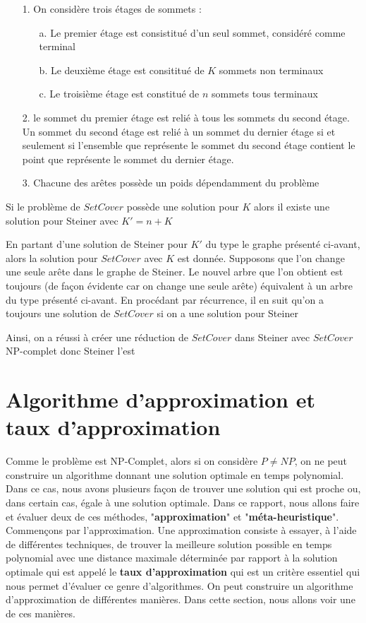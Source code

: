 \documentclass[11pt,french]{report}
\begin{document}
        \begin{itemize}
	\item[1.] On considère trois étages de sommets :
          \begin{itemize}
          \item[a.] Le premier étage est consistitué d'un seul sommet, considéré comme terminal
          \item[b.] Le deuxième étage est consititué de $K$ sommets non terminaux
          \item[c.] Le troisième étage est constitué de $n$ sommets tous terminaux
          \end{itemize}
        \item[2.] le sommet du premier étage est relié à tous les sommets du second étage. Un sommet du second étage est relié à un sommet du dernier étage si et seulement si l'ensemble que représente le sommet du second étage contient le point que représente le sommet du dernier étage.
          \item[3.] Chacune des arêtes possède un poids dépendamment du problème
	\end{itemize}

        Si le problème de $Set Cover$ possède une solution pour $K$ alors il existe une solution pour Steiner avec $K' = n+K$

        En partant d'une solution de Steiner pour $K'$ du type le graphe présenté ci-avant, alors la solution pour $Set Cover$ avec $K$ est donnée.
        Supposons que l'on change une seule arête dans le graphe de Steiner. Le nouvel arbre que l'on obtient est toujours (de façon évidente car on change une seule arête) équivalent à un arbre du type présenté ci-avant. En procédant par récurrence, il en suit qu'on a toujours une solution de $Set Cover$ si on a une solution pour Steiner


        Ainsi, on a réussi à créer une réduction de $Set Cover$ dans Steiner avec $Set Cover$ NP-complet donc Steiner l'est
        
	\section{Algorithme d'approximation et taux d'approximation\label{Approx}}
	Comme le problème est NP-Complet, alors si on considère $P\neq NP$, on ne peut construire un algorithme donnant une solution optimale en temps polynomial. Dans ce cas, nous avons plusieurs façon de trouver une solution qui est proche ou, dans certain cas, égale à une solution optimale. Dans ce rapport, nous allons faire et évaluer deux de ces méthodes, "\textbf{approximation}" et "\textbf{méta-heuristique}". Commençons par l'approximation. Une approximation consiste à essayer, à l'aide de différentes techniques, de trouver la meilleure solution possible en temps polynomial avec une distance maximale déterminée par rapport à la solution optimale qui est appelé le \textbf{taux d'approximation} qui est un critère essentiel qui nous permet d'évaluer ce genre d'algorithmes. On peut construire un algorithme d'approximation de différentes manières. Dans cette section, nous allons voir une de ces manières.
	
\end{document}
